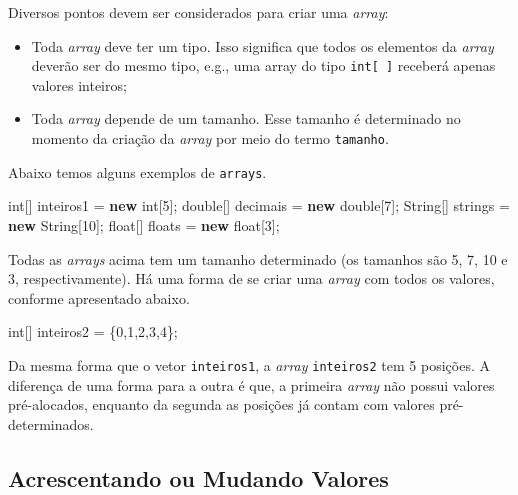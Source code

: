 \documentclass[
]{book}
\newenvironment{Shaded}{\begin{snugshade}}{\end{snugshade}}
\newcommand{\BuiltInTok}[1]{#1}
\newcommand{\DataTypeTok}[1]{\textcolor[rgb]{0.13,0.29,0.53}{#1}}
\newcommand{\DecValTok}[1]{\textcolor[rgb]{0.00,0.00,0.81}{#1}}
\newcommand{\KeywordTok}[1]{\textcolor[rgb]{0.13,0.29,0.53}{\textbf{#1}}}
\newcommand{\NormalTok}[1]{#1}
\providecommand{\tightlist}{%
  \setlength{\itemsep}{0pt}\setlength{\parskip}{0pt}}
\begin{document}
Diversos pontos devem ser considerados para criar uma \emph{array}:

\begin{itemize}
\tightlist
\item
  Toda \emph{array} deve ter um tipo. Isso significa que todos os elementos da \emph{array} deverão ser do mesmo tipo, e.g., uma array do tipo \texttt{int{[}\ {]}} receberá apenas valores inteiros;
\item
  Toda \emph{array} depende de um tamanho. Esse tamanho é determinado no momento da criação da \emph{array} por meio do termo \texttt{tamanho}.
\end{itemize}

Abaixo temos alguns exemplos de \texttt{arrays}.

\begin{Shaded}
\begin{Highlighting}[]
\DataTypeTok{int}\NormalTok{[] inteiros1 = }\KeywordTok{new} \DataTypeTok{int}\NormalTok{[}\DecValTok{5}\NormalTok{];}
\DataTypeTok{double}\NormalTok{[] decimais = }\KeywordTok{new}  \DataTypeTok{double}\NormalTok{[}\DecValTok{7}\NormalTok{];}
\BuiltInTok{String}\NormalTok{[] strings = }\KeywordTok{new} \BuiltInTok{String}\NormalTok{[}\DecValTok{10}\NormalTok{];}
\DataTypeTok{float}\NormalTok{[] floats = }\KeywordTok{new} \DataTypeTok{float}\NormalTok{[}\DecValTok{3}\NormalTok{];}
\end{Highlighting}
\end{Shaded}

Todas as \emph{arrays} acima tem um tamanho determinado (os tamanhos são 5, 7, 10 e 3, respectivamente). Há uma forma de se criar uma \emph{array} com todos os valores, conforme apresentado abaixo.

\begin{Shaded}
\begin{Highlighting}[]
\DataTypeTok{int}\NormalTok{[] inteiros2 = \{}\DecValTok{0}\NormalTok{,}\DecValTok{1}\NormalTok{,}\DecValTok{2}\NormalTok{,}\DecValTok{3}\NormalTok{,}\DecValTok{4}\NormalTok{\};}
\end{Highlighting}
\end{Shaded}

Da mesma forma que o vetor \texttt{inteiros1}, a \emph{array} \texttt{inteiros2} tem 5 posições. A diferença de uma forma para a outra é que, a primeira \emph{array} não possui valores pré-alocados, enquanto da segunda as posições já contam com valores pré-determinados.

\hypertarget{acrescentando-ou-mudando-valores}{%
\subsection{Acrescentando ou Mudando Valores}\label{acrescentando-ou-mudando-valores}}
\end{document}
